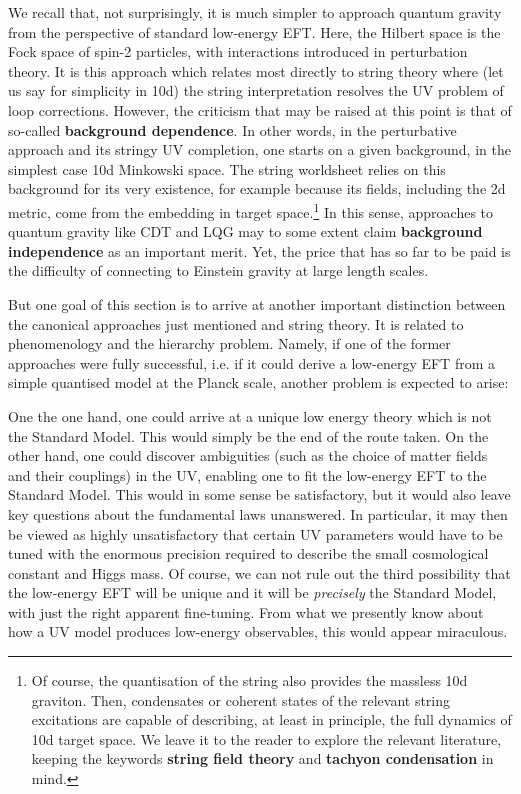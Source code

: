 \documentclass[12pt]{article}
\numberwithin{equation}{section}
\begin{document}
We recall that, not surprisingly, it is much simpler to approach quantum gravity from the perspective of standard low-energy EFT. Here, the Hilbert space is the Fock space of spin-2 particles, with interactions introduced in perturbation theory. It is this approach which relates most directly to string theory where (let us say for simplicity in 10d) the string interpretation resolves the UV problem of loop corrections. However, the criticism that may be raised at this point is that of so-called {\bf background dependence}. In other words, in the perturbative approach and its stringy UV completion, one starts on a given background, in the simplest case 10d Minkowski space. The string worldsheet relies on this background for its very existence, for example because its fields, including the 2d metric, come from the embedding in target space.\footnote{
Of 
course, the quantisation of the string also provides the massless 10d graviton. Then, condensates or coherent states of the relevant string excitations are capable of describing, at least in principle, the full dynamics of 10d target space. We leave it to the reader to explore the relevant literature, keeping the keywords {\bf string field theory} and {\bf tachyon condensation} in mind.
}
In this sense, approaches to quantum gravity like CDT and LQG may to some extent claim {\bf background independence} as an important merit. Yet, the price that has so far to be paid is the difficulty of connecting to Einstein gravity at large length scales.

But one goal of this section is to arrive at another important distinction between the canonical approaches just mentioned and string theory. It is related to phenomenology and the hierarchy problem. Namely, if one of the former approaches were fully successful, i.e. if it could derive a low-energy EFT from a simple quantised model at the Planck scale, another problem is expected to arise: 

One the one hand, one could arrive at a unique low energy theory which is not the Standard Model. This would simply be the end of the route taken. On the other hand, one could discover ambiguities (such as the choice of matter fields and their couplings) in the UV, enabling one to fit the low-energy EFT to the Standard Model. This would in some sense be satisfactory, but it would also leave key questions about the fundamental laws unanswered. In particular, it may then be viewed as highly unsatisfactory that certain UV parameters would have to be tuned with the enormous precision required to describe the small cosmological constant and Higgs mass. Of course, we can not rule out the third possibility that the low-energy EFT will be unique and it will be {\it precisely} the Standard Model, with just the right apparent fine-tuning. From what we presently know about how a UV model produces low-energy observables, this would appear miraculous.
\end{document}
